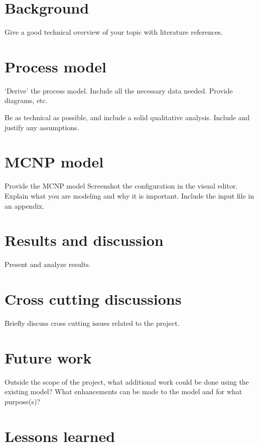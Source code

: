 \documentclass[11pt,a4paper]{article}
\begin{document}
\section{Background} \label{background}
Give a good technical overview of your topic with literature references.

\newpage

\section{Process model} \label{process-model}
`Derive' the process model. Include all the necessary data needed. Provide diagrams, etc.

Be as technical as possible, and include a solid qualitative analysis. Include and justify any assumptions.

\newpage

\section{MCNP model} \label{mcnp-model}
Provide the MCNP model Screenshot the configuration in the visual editor. Explain what you are modeling and why it is important. Include the input file in an appendix.

\newpage

\section{Results and discussion} \label{results-discussion}
Present and analyze results.

\newpage

\section{Cross cutting discussions} \label{cross-cutting}
Briefly discuss cross cutting issues related to the project.

\newpage

\section{Future work} \label{future-work}
Outside the scope of the project, what additional work could be done using the existing model? What enhancements can be made to the model and for what purpose(s)?

\newpage

\section{Lessons learned} \label{lessons-learned}
\end{document}
